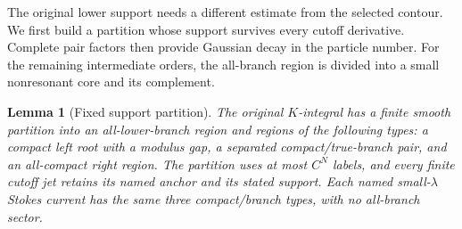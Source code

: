 \documentclass[11pt]{article}
\numberwithin{equation}{section}
\newtheorem{lemma}[theorem]{Lemma}
\theoremstyle{definition}
\begin{document}
The original lower support needs a different estimate from the selected
contour. We first build a partition whose support survives every cutoff
derivative. Complete pair factors then provide Gaussian decay in the
particle number. For the remaining intermediate orders, the all-branch
region is divided into a small nonresonant core and its complement.
\begin{lemma}[Fixed support partition]\label{lem:partition}
The original \(K\)-integral has a finite smooth partition into an
all-lower-branch region and regions of the following types: a compact
left root with a modulus gap, a separated compact/true-branch pair,
and an all-compact right region. The partition uses at most \(C^N\)
labels, and every finite cutoff jet retains its named anchor and its
stated support.
Each named small-\(\lambda\) Stokes current has the same three
compact/branch types, with no all-branch sector.
\end{lemma}
\end{document}
